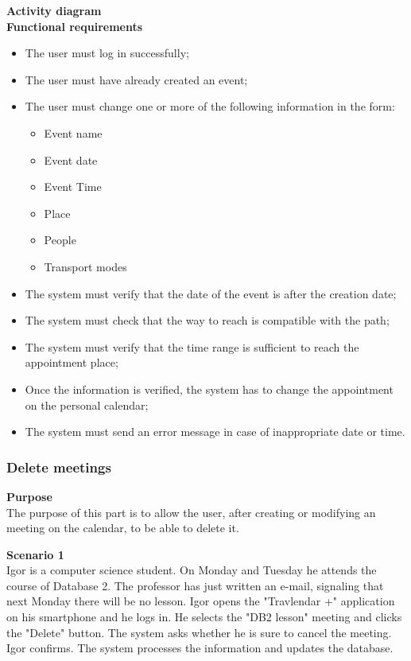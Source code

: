 \documentclass{article}
\begin{document}
	\bigskip
	\noindent
	\textbf{Activity diagram} \\
	
	
	\bigskip
	\noindent
	\textbf{Functional requirements} \\
	\begin{itemize}
		\item The user must log in successfully;
		\item The user must have already created an event;
		\item The user must change one or more of the following information in the form:
			\begin{itemize}
				\item Event name
				\item Event date
				\item Event Time
				\item Place
				\item People
				\item Transport modes
			\end{itemize}
		\item The system must verify that the date of the event is after the creation date;
		\item The system must check that the way to reach is compatible with the path;
		\item The system must verify that the time range is sufficient to reach the appointment place;
		\item Once the information is verified, the system has to change the appointment on the personal calendar;
		\item The system must send an error message in case of inappropriate date or time.
	\end{itemize}


	\subsubsection{Delete meetings}
	
	\bigskip
	\noindent
	\textbf{Purpose} \\
	The purpose of this part is to allow the user, after creating or modifying an meeting on the calendar, to be able to delete it.
	
	\bigskip
	\noindent
	\textbf{Scenario 1} \\
	Igor is a computer science student. On Monday and Tuesday he attends the course of Database 2. The professor has just written an e-mail, signaling that next Monday there will be no lesson. Igor opens the "Travlendar +" application on his smartphone and he logs in. He selects the "DB2 lesson" meeting and clicks the "Delete" button. The system asks whether he is sure to cancel the meeting. Igor confirms. The system processes the information and updates the database.
	
\end{document}
